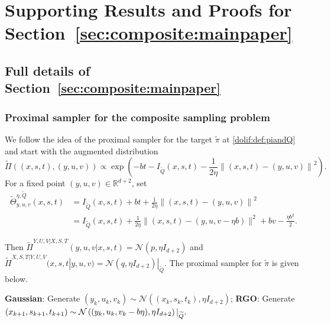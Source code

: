 \documentclass[11pt,letterpaper]{article}
\newcommand{\R}{\mathbb{R}}
\newcommand{\norm}[1]{\left\lVert #1 \right\rVert}
\newcommand{\Q}{\widetilde{Q}}
\newcommand{\nn}{\nonumber}
\newcommand{\brac}[1]{\left( #1\right)}
\begin{document}
\section{Supporting Results and Proofs for Section~\ref{sec:composite:mainpaper}}


\subsection{Full details of Section~\ref{sec:composite:mainpaper}}
\label{dolif:appen:fulldetails}

\subsubsection{Proximal sampler for the composite sampling problem}
\label{dolif:sec:ASF}

We follow the idea of the proximal sampler for the target $\tilde{\pi}$ at \eqref{dolif:def:piandQ} and start with the augmented distribution
\begin{equation}
\label{dolif:def:Pi:appen}
    \widetilde{\Pi}\brac{(x,s,t),(y,u,v)}\propto \exp\brac{-bt-I_{\Q}(x,s,t)-\frac{1}{2\eta}\norm{(x,s,t)-(y,u,v) }^2}.
\end{equation}
For a fixed point $(y,u,v)\in \R^{d+2}$,  set
\begin{align}
\label{dolif:def:Theta:appen}
    \widetilde{\Theta}^{\eta,\Q}_{y,u,v}(x,s,t)&=I_{\Q}(x,s,t)+bt+\frac{1}{2\eta}\norm{(x,s,t)-(y,u,v) }^2\nn\\
    &=I_{\Q}(x,s,t)+\frac{1}{2\eta}\|(x,s,t)-(y,u,v-\eta b)\|^2
+bv-\frac{\eta b^2}{2}. 
\end{align}




Then $\widetilde{\Pi}^{Y,U,V|X,S,T}(y,u,v|x,s,t)=\mathcal{N}\brac{p,\eta I_{d+2}}$ and $ \widetilde{\Pi}^{X,S,T|Y,U,V}(x,s,t|y,u,v)=\mathcal{N}\brac{q,\eta I_{d+2}}|_{\Q}$. The proximal sampler for $\tilde{\pi}$ is given below.


\begin{algorithm}[H]
	\caption{Proximal sampler for the target $\tilde{\pi}$ at \eqref{dolif:def:piandQ}}
	\label{dolif:alg:ASF_pi}
	\begin{algorithmic}[1]
		\State \textbf{Gaussian}: Generate $(y_k,u_k,v_k)\sim  \mathcal{N}\brac{(x_k,s_k,t_k),\eta I_{d+2}}$; 
		\State \textbf{RGO}: Generate $(x_{k+1},s_{k+1},t_{k+1})\sim {\cal N}\brac{(y_k,u_k,v_k-b\eta),\eta I_{d+2}}|_{\Q}.$ 
	\end{algorithmic}
\end{algorithm}
\end{document}
